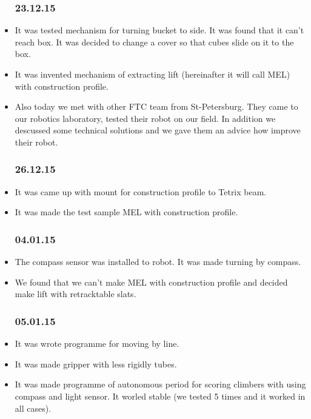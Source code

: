 \begin{itemize}
	\subsubsection{23.12.15}
		\item It was tested mechanism for turning bucket to side. It was found that it can't reach box. It was decided to change a cover so that cubes slide on it to the box.
	
		\item It was invented mechanism of extracting lift (hereinafter it will call MEL) with construction profile.
	
		\item Also today we met with other FTC team from St-Petersburg. They came to our robotics laboratory, tested their robot on our field. In addition we descussed some technical solutions and we gave them an advice how improve their robot.
	\subsubsection{26.12.15}
		\item It was came up with mount for construction profile to Tetrix beam.
		
		\item It was made the test sample MEL with construction profile.
	\subsubsection{04.01.15}
		\item The compass sensor was installed to robot. It was made turning by compass.
		
		\item We found that we can't make MEL with construction profile and decided make lift with retracktable slats.
	\subsubsection{05.01.15}
		\item It was wrote programme for moving by line.
		
		\item It was made gripper with less rigidly tubes.
		
		\item It was made programme of autonomous period for scoring climbers with using compass and light sensor. It worled stable (we tested 5 times and it worked in all cases).
		

\end{itemize}
